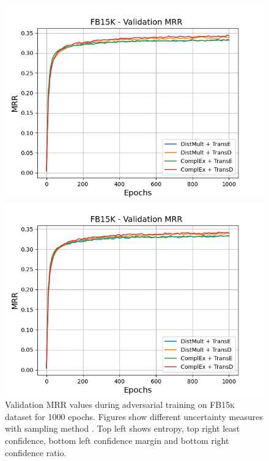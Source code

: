 \begin{figure}[H]
\begin{minipage}{.5\textwidth}
    \end{minipage}
    \begin{minipage}{.5\textwidth}
      \centering
      \includegraphics[width=0.9\linewidth]{figures/results/gan_train/not_pretrained/uncertainty/max_distribution/confidence_margin/fb15k/uncertainty_fb15k_mrrs.png}
    \end{minipage}%
    \begin{minipage}{.5\textwidth}
      \centering
      \includegraphics[width=0.9\linewidth]{figures/results/gan_train/not_pretrained/uncertainty/max_distribution/confidence_ratio/fb15k/uncertainty_fb15k_mrrs.png}
    \end{minipage}%
    \caption{Validation MRR values during adversarial training on \textsc{FB15k} dataset for 1000 epochs. 
    Figures show different uncertainty measures with sampling method  \ussoftmax.
    Top left shows entropy, top right least confidence, 
    bottom left confidence margin and bottom right confidence ratio.}
    \label{fig:advtrain_metrics_fb15k}
\end{figure}

